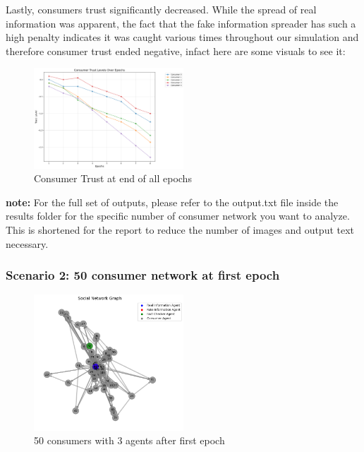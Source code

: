\documentclass[twoside]{article}
\begin{document}
Lastly, consumers trust significantly decreased. While the spread of real information was apparent, the fact that the fake information spreader has such a high penalty indicates it was caught various times throughout our simulation and therefore consumer trust ended negative, infact here are some visuals to see it:

\begin{figure}[htbp]
     \centering
     \includegraphics[width=0.5\textwidth]{../results/images/consumertrust.png}
     \caption{Consumer Trust at end of all epochs}
     \label{fig: 52 consumer, 3 agents}
 \end{figure}

\textbf{note:} For the full set of outputs, please refer to the output.txt file inside the results folder for the specific number of consumer network you want to analyze. This is shortened for the report to reduce the number of images and output text necessary.

\subsubsection{Scenario 2: 50 consumer network at first epoch}
\begin{figure}[htbp]
     \centering
     \includegraphics[width=0.5\textwidth]{../results/50consumer/50_initial.png}
     \caption{50 consumers with 3 agents after first epoch}
     \label{fig: 50 consumer, 3 agents}
 \end{figure}
\end{document}
